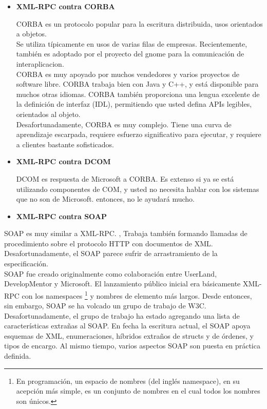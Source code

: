 \begin{itemize} 

\item \textbf{XML-RPC contra CORBA}

CORBA es un protocolo popular para la escritura distribuida, usos orientados a objetos.\\
Se utiliza típicamente en usos de varias filas de empresas. Recientemente, también es adoptado por el proyecto del gnome para la comunicación de interaplicacion.\\

CORBA es muy apoyado por muchos vendedores y varios proyectos de software libre. CORBA trabaja bien con Java y C++, y está disponible para muchos otras idiomas. CORBA también proporciona una lengua excelente de la definición de interfaz (IDL), permitiendo que usted defina APIs legibles, orientados al objeto.\\

Desafortunadamente, CORBA es muy complejo. Tiene una curva de aprendizaje escarpada, requiere esfuerzo significativo para ejecutar, y requiere a clientes bastante sofisticados.

\item \textbf{XML-RPC contra DCOM}

DCOM es respuesta de Microsoft a CORBA. Es extenso si ya se está utilizando componentes de COM, y usted no necesita hablar con los sistemas que no son de Microsoft. entonces, no le ayudará mucho.

\item \textbf{XML-RPC contra SOAP}
\end{itemize}
SOAP es muy similar a XML-RPC. , Trabaja también formando llamadas de procedimiento sobre el protocolo HTTP con documentos de XML. Desafortunadamente, el SOAP parece sufrir de arrastramiento de la especificación.\\

SOAP fue creado originalmente como colaboración entre UserLand, DevelopMentor y Microsoft. El lanzamiento público inicial era básicamente XML-RPC con los namespaces \footnote{En programación, un espacio de nombres (del inglés namespace), en su acepción más simple, es un conjunto de nombres en el cual todos los nombres son únicos.} y nombres de elemento más largos. Desde entonces, sin embargo, SOAP se ha volcado un grupo de trabajo de W3C.\\

Desafortunadamente, el grupo de trabajo ha estado agregando una lista de características extrañas al SOAP. En fecha la escritura actual, el SOAP apoya esquemas de XML, enumeraciones, híbridos extraños de structs y de órdenes, y tipos de encargo. Al mismo tiempo, varios aspectos SOAP son puesta en práctica definida.

%
